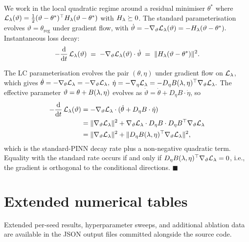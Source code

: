 \documentclass[12pt,a4paper]{extarticle}
\begin{document}
We work in the local quadratic regime around a residual minimiser $\theta^*$ where $\mathcal{L}_\lambda(\vartheta) = \tfrac{1}{2} (\vartheta - \theta^*)^\top H_\lambda (\vartheta - \theta^*)$ with $H_\lambda \succeq 0$. The standard parameterisation evolves $\vartheta = \theta_{\mathrm{reg}}$ under gradient flow, with
\(
    \dot \vartheta = - \nabla_\vartheta \mathcal{L}_\lambda(\vartheta) = - H_\lambda (\vartheta - \theta^*).
\)
Instantaneous loss decay:
\begin{equation*}
    -\frac{\mathrm{d}}{\mathrm{d} t}\, \mathcal{L}_\lambda(\vartheta)
    \;=\; - \nabla_\vartheta \mathcal{L}_\lambda(\vartheta) \cdot \dot \vartheta
    \;=\; \|H_\lambda (\vartheta - \theta^*)\|^2.
\end{equation*}

The LC parameterisation evolves the pair $(\theta, \eta)$ under gradient flow on $\mathcal{L}_\lambda$, which gives
\(
    \dot\theta = - \nabla_\theta \mathcal{L}_\lambda = -\nabla_\vartheta \mathcal{L}_\lambda,
\)
\(
    \dot\eta = -\nabla_\eta \mathcal{L}_\lambda = -D_\eta B(\lambda, \eta)^\top \nabla_\vartheta \mathcal{L}_\lambda.
\)
The effective parameter $\vartheta = \theta + B(\lambda, \eta)$ evolves as $\dot \vartheta = \dot \theta + D_\eta B \cdot \dot \eta$, so
\begin{align*}
    -\frac{\mathrm{d}}{\mathrm{d} t}\, \mathcal{L}_\lambda(\vartheta)
    &= - \nabla_\vartheta \mathcal{L}_\lambda \cdot (\dot \theta + D_\eta B \cdot \dot \eta) \\
    &= \|\nabla_\vartheta \mathcal{L}_\lambda\|^2 + \nabla_\vartheta \mathcal{L}_\lambda \cdot D_\eta B \cdot D_\eta B^\top \nabla_\vartheta \mathcal{L}_\lambda \\
    &= \|\nabla_\vartheta \mathcal{L}_\lambda\|^2 + \|D_\eta B(\lambda, \eta)^\top \nabla_\vartheta \mathcal{L}_\lambda\|^2,
\end{align*}
which is the standard-PINN decay rate plus a non-negative quadratic term. Equality with the standard rate occurs if and only if $D_\eta B(\lambda, \eta)^\top \nabla_\vartheta \mathcal{L}_\lambda = 0$, i.e., the gradient is orthogonal to the conditional directions. $\blacksquare$

\section{Extended numerical tables}
\label{app:tables}

Extended per-seed results, hyperparameter sweeps, and additional ablation data are available in the JSON output files committed alongside the source code.
\end{document}
